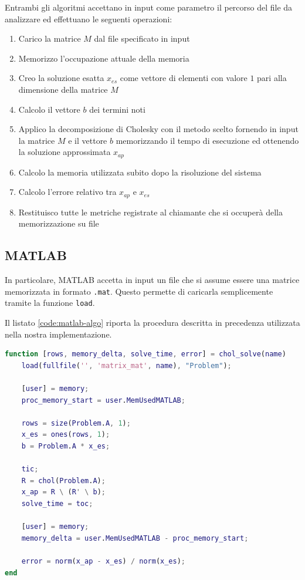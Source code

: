 \documentclass[11pt,italian]{article}
\begin{document}
Entrambi gli algoritmi accettano in input come parametro il percorso del file da analizzare ed effettuano le seguenti operazioni:
\begin{enumerate}
    \item Carico la matrice $M$ dal file specificato in input
    \item Memorizzo l'occupazione attuale della memoria
    \item Creo la soluzione esatta $x_{es}$ come vettore di elementi con valore $1$ pari alla dimensione della matrice $M$
    \item Calcolo il vettore $b$ dei termini noti
    \item Applico la decomposizione di Cholesky con il metodo scelto fornendo in input la matrice $M$ e il vettore $b$ memorizzando il tempo di esecuzione ed ottenendo la soluzione approssimata $x_{ap}$
    \item Calcolo la memoria utilizzata subito dopo la risoluzione del sistema
    \item Calcolo l'errore relativo tra $x_{ap}$ e $x_{es}$
    \item Restituisco tutte le metriche registrate al chiamante che si occuperà della memorizzazione su file
\end{enumerate}

\subsection{MATLAB}
In particolare, MATLAB accetta in input un file che si assume essere una matrice memorizzata in formato \lstinline{.mat}. Questo permette di caricarla semplicemente tramite la funzione \lstinline{load}.

Il listato \ref{code:matlab-algo} riporta la procedura descritta in precedenza utilizzata nella nostra implementazione.

\newpage
\begin{lstlisting}[language=Matlab,emph={ones},caption=MATLAB: Algoritmo principale,label=code:matlab-algo]
function [rows, memory_delta, solve_time, error] = chol_solve(name)
    load(fullfile('', 'matrix_mat', name), "Problem");

    [user] = memory;
    proc_memory_start = user.MemUsedMATLAB;

    rows = size(Problem.A, 1);
    x_es = ones(rows, 1);
    b = Problem.A * x_es;

    tic;
    R = chol(Problem.A);
    x_ap = R \ (R' \ b);
    solve_time = toc;

    [user] = memory;
    memory_delta = user.MemUsedMATLAB - proc_memory_start;

    error = norm(x_ap - x_es) / norm(x_es);
end
\end{lstlisting}
\end{document}

